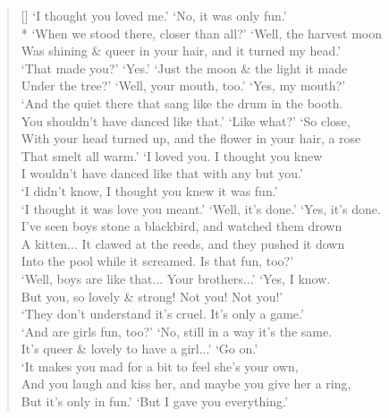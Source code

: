 \documentclass[MAIN]{subfiles}
\begin{document}
\settowidth{\versewidth}{`I thought it was love you meant.' `Well, it's done.' `Yes, it's done.}
\begin{verse}[\versewidth]
`I thought you loved me.' `No, it was only fun.'\\*
`When we stood there, closer than all?' `Well, the harvest moon\\
Was shining \& queer in your hair, and it turned my head.'\\
`That made you?' `Yes.' `Just the moon \& the light it made\\
Under the tree?' `Well, your mouth, too.' `Yes, my mouth?'\\
`And the quiet there that sang like the drum in the booth.\\
You shouldn't have danced like that.' `Like what?' `So close,\\
With your head turned up, and the flower in your hair, a rose\\
That smelt all warm.' `I loved you. I thought you knew\\
I wouldn't have danced like that with any but you.'\\
`I didn't know, I thought you knew it was fun.'\\
`I thought it was love you meant.' `Well, it's done.' `Yes, it's done.\\
I've seen boys stone a blackbird, and watched them drown\\
A kitten... It clawed at the reeds, and they pushed it down\\
Into the pool while it screamed. Is that fun, too?'\\
`Well, boys are like that... Your brothers...' `Yes, I know.\\
But you, so lovely \& strong! Not you! Not you!'\\
`They don't understand it's cruel. It's only a game.'\\
`And are girls fun, too?' `No, still in a way it's the same.\\
It's queer \& lovely to have a girl...' `Go on.'\\
`It makes you mad for a bit to feel she's your own,\\
And you laugh and kiss her, and maybe you give her a ring,\\
But it's only in fun.' `But I gave you everything.'\\

\end{verse}
\end{document}
